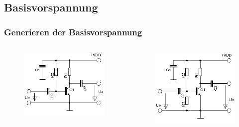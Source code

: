 \subsection*{Basisvorspannung}
\begin{frame}
  \frametitle{Generieren der Basisvorspannung}
  \begin{columns}
    \begin{center}
      \begin{figure}
        \includegraphics[width=\textwidth,height=.7\textheight,keepaspectratio]{a06/Transistor-Verstaerker.png}
      \end{figure}
    \end{center}
    \begin{center}
      \begin{figure}
        \includegraphics[width=\textwidth,height=.7\textheight,keepaspectratio]{a06/Transistor-Verstaerker-C.png}

\end{figure}
\end{center}
\end{columns}
\end{frame}
